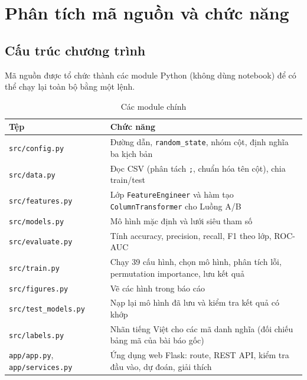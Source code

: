 \documentclass[12pt,a4paper,oneside]{report}
\newcommand{\code}[1]{\texttt{#1}}
\begin{document}
\chapter{Phân tích mã nguồn và chức năng}
\section{Cấu trúc chương trình}
Mã nguồn được tổ chức thành các module Python (không dùng notebook) để có thể chạy lại toàn bộ bằng một lệnh.
\begin{table}[H]
\centering
\caption{Các module chính}\label{tab:modules}
\begin{tabularx}{\textwidth}{@{}lX@{}}
\toprule
\textbf{Tệp} & \textbf{Chức năng}\\
\midrule
\code{src/config.py} & Đường dẫn, \code{random\_state}, nhóm cột, định nghĩa ba kịch bản\\
\code{src/data.py} & Đọc CSV (phân tách \code{;}, chuẩn hóa tên cột), chia train/test\\
\code{src/features.py} & Lớp \code{FeatureEngineer} và hàm tạo \code{ColumnTransformer} cho Luồng A/B\\
\code{src/models.py} & Mô hình mặc định và lưới siêu tham số\\
\code{src/evaluate.py} & Tính accuracy, precision, recall, F1 theo lớp, ROC-AUC\\
\code{src/train.py} & Chạy 39 cấu hình, chọn mô hình, phân tích lỗi, permutation importance, lưu kết quả\\
\code{src/figures.py} & Vẽ các hình trong báo cáo\\
\code{src/test\_models.py} & Nạp lại mô hình đã lưu và kiểm tra kết quả có khớp\\
\code{src/labels.py} & Nhãn tiếng Việt cho các mã danh nghĩa (đối chiếu bảng mã của bài báo gốc)\\
\code{app/app.py}, \code{app/services.py} & Ứng dụng web Flask: route, REST API, kiểm tra đầu vào, dự đoán, giải thích\\
\bottomrule
\end{tabularx}
\end{table}
\end{document}
